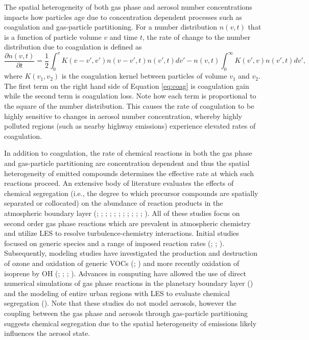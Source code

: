 The spatial heterogeneity of both gas phase and aerosol number concentrations impacts how particles age due to concentration dependent processes such as coagulation and gas-particle partitioning. For a number distribution $n(v,t)$ that is a function of particle volume $v$ and time $t$, the rate of change to the number distribution due to coagulation is defined as 
\begin{equation}
\frac{\partial n(v, t)}{\partial t} = \frac{1}{2}\int_0^{v}K(v-v', v')n(v-v', t)n(v', t)dv' - n(v,t)\int_0^{\infty}K(v',v)n(v',t)dv',
\label{eq:coag}
\end{equation}
where $K(v_1, v_2)$ is the coagulation kernel between particles of volume $v_1$ and $v_2$. The first term on the right hand side of Equation \ref{eq:coag} is coagulation gain while the second term is coagulation loss. Note how each term is proportional to the square of the number distribution. This causes the rate of coagulation to be highly sensitive to changes in aerosol number concentration, whereby highly polluted regions (such as nearby highway emissions) experience elevated rates of coagulation. 

In addition to coagulation, the rate of chemical reactions in both the gas phase and gas-particle partitioning are concentration dependent and thus the spatial heterogeneity of emitted compounds  determines the effective rate at which such reactions proceed. An extensive body of literature evaluates the effects of chemical segregation (i.e., the degree to which precursor compounds are spatially separated or collocated) on the abundance of reaction products in the atmospheric boundary layer (\cite{schumann_large-eddy_1989}; \cite{sykes_turbulent_1994}; \cite{molemaker_control_1998}; \cite{krol_effects_2000}; \cite{vinuesa_fluxes_2003}; \cite{auger_chemical_2007}; \cite{pugh_influence_2011}; \cite{ouwersloot_segregation_2011}; \cite{dlugi_balances_2014}; \cite{kim_impact_2016}; \cite{li_error_2021}; \cite{wang_segregation_2022}). All of these studies focus on second order gas phase reactions which are prevalent in atmospheric chemistry and utilize LES to resolve turbulence-chemistry interactions. Initial studies focused on generic species and a range of imposed reaction rates (\cite{schumann_large-eddy_1989}; \cite{sykes_turbulent_1994};  \cite{molemaker_control_1998}). Subsequently, modeling studies have investigated the production and destruction of ozone and oxidation of generic VOCs (\cite{krol_effects_2000}; \cite{auger_chemical_2007}) and more recently oxidation of isoprene by OH (\cite{pugh_influence_2011}; \cite{ouwersloot_segregation_2011}; \cite{dlugi_balances_2014}; \cite{kim_impact_2016}). Advances in computing have allowed the use of direct numerical simulations of gas phase reactions in the planetary boundary layer (\cite{li_error_2021}) and the modeling of entire urban regions with LES to evaluate chemical segregation (\cite{wang_segregation_2022}). Note that these studies do not model aerosols, however the coupling between the gas phase and aerosols through gas-particle partitioning suggests  chemical segregation due to the spatial heterogeneity of emissions likely influences the aerosol state. %

